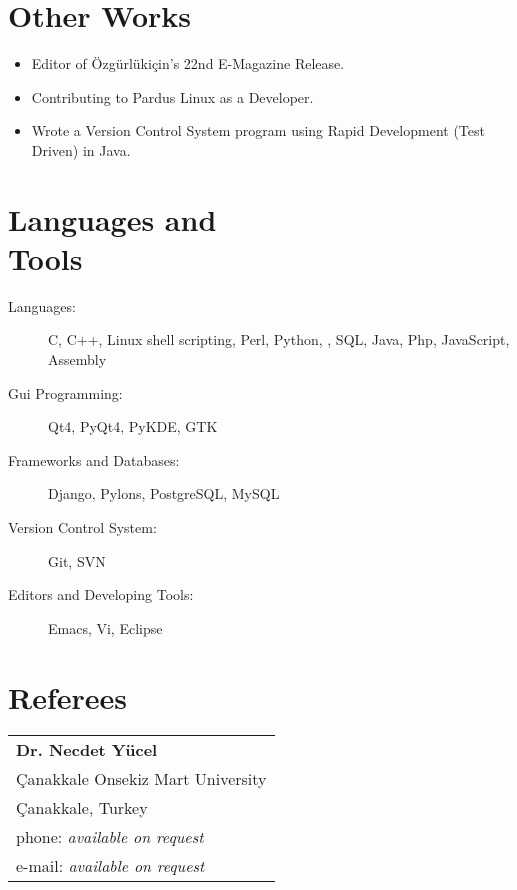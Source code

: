 \documentclass[margin,line]{resume}
\begin{document}
\begin{resume}
    \section{\mysidesytle Other Works}

    \begin{itemize}
    \item Editor of Özgürlükiçin's 22nd E-Magazine Release.
    \item Contributing to Pardus Linux as a Developer.
    \item Wrote a Version Control System program using Rapid Development (Test Driven) in Java.
    \end{itemize}
    \section{\mysidestyle Languages and \\ Tools} 

	\begin{description}
	\item[Languages: ] C, C++, Linux shell scripting, Perl, Python, \LaTeXe, SQL, Java, Php, JavaScript, Assembly
    \item[Gui Programming: ] Qt4, PyQt4, PyKDE, GTK
    \item[Frameworks and Databases: ] Django, Pylons, PostgreSQL, MySQL
    \item[Version Control System: ] Git, SVN
    \item[Editors and Developing Tools: ] Emacs, Vi, Eclipse
    \end{description}



\section{\mysidestyle Referees} 

\begin{tabular}{@{}p{6cm}} %
\textbf{Dr. Necdet Yücel}     \\
Çanakkale Onsekiz Mart University       \\
Çanakkale, Turkey                 \\
phone: \textsl{available on request}       \\
e-mail: \textsl{available on request}     \\
\end{tabular}


\end{resume}
\end{document}
